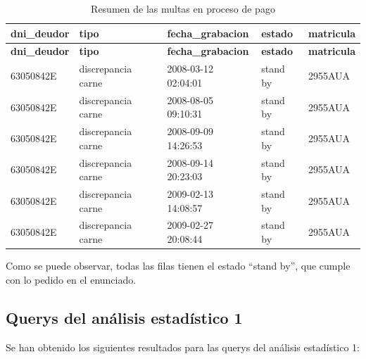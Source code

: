 \documentclass[]{article}
\begin{document}
\begin{table}[H]
\begin{longtable}{lllll}
    \hline
    \textbf{dni\_deudor} & \textbf{tipo} & \textbf{fecha\_grabacion} & \textbf{estado} & \textbf{matricula} \\ \hline
    \endfirsthead

    \hline
    \textbf{dni\_deudor} & \textbf{tipo} & \textbf{fecha\_grabacion} & \textbf{estado} & \textbf{matricula} \\ \hline
    \endhead
    
    63050842E & discrepancia carne & 2008-03-12 02:04:01 & stand by & 2955AUA \\ \hline
    63050842E & discrepancia carne & 2008-08-05 09:10:31 & stand by & 2955AUA \\ \hline
    63050842E & discrepancia carne & 2008-09-09 14:26:53 & stand by & 2955AUA \\ \hline
    63050842E & discrepancia carne & 2008-09-14 20:23:03 & stand by & 2955AUA \\ \hline
    63050842E & discrepancia carne & 2009-02-13 14:08:57 & stand by & 2955AUA \\ \hline
    63050842E & discrepancia carne & 2009-02-27 20:08:44 & stand by & 2955AUA \\ \hline
    
\end{longtable}
\caption{Resumen de las multas en proceso de pago}
\end{table}

Como se puede observar, todas las filas tienen el estado ``stand by'', que cumple con lo pedido en el enunciado.

\subsection{Querys del análisis estadístico 1}
Se han obtenido los siguientes resultados para las querys del análisis estadístico 1:
\end{document}
